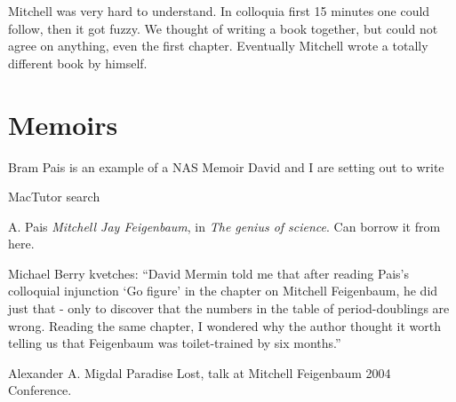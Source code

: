 Mitchell was very hard to understand. In colloquia first 15 minutes one
could follow, then it got fuzzy. We thought of writing a book together,
but could not agree on anything, even the first chapter. Eventually
Mitchell wrote a totally different book by himself.

\section{Memoirs}
\label{sect:Memoirs}

{Bram Pais} is an example of a NAS Memoir David and I are setting out to
write

{MacTutor} search


A. Pais
{\em Mitchell Jay Feigenbaum}, in {\em The genius of science}.
Can borrow it from
 {here}.

Michael Berry
{kvetches}: ``David Mermin told me that after reading Pais's colloquial
injunction `Go figure' in the chapter on Mitchell Feigenbaum, he did just
that - only to discover that the numbers in the table of period-doublings
are wrong. Reading the same chapter, I wondered why the author thought it
worth telling us that Feigenbaum was toilet-trained by six months.''

 Alexander A. Migdal
 {Paradise Lost},
talk at Mitchell Feigenbaum 2004 Conference.


\printbibliography[heading=subbibintoc,title={References}]
